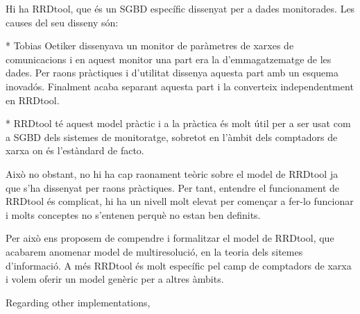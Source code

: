 Hi ha RRDtool, que és un SGBD específic dissenyat per a dades monitorades. Les causes del seu disseny són:

* Tobias Oetiker dissenyava un monitor de paràmetres de xarxes de comunicacions i en aquest monitor una part era la d'emmagatzematge de les dades. Per raons pràctiques i d'utilitat dissenya aquesta part amb un esquema inovadós. Finalment acaba separant aquesta part i la converteix independentment en RRDtool.

* RRDtool té aquest model pràctic i a la pràctica és molt útil per a ser usat com a SGBD dels sistemes de monitoratge, sobretot en l'àmbit dels comptadors de xarxa on és l'estàndard de facto. 

Això no obstant, no hi ha cap raonament teòric sobre el model de RRDtool ja que s'ha dissenyat per raons pràctiques. Per tant, entendre el funcionament de RRDtool és complicat, hi ha un nivell molt elevat per començar a fer-lo funcionar i molts conceptes no s'entenen perquè no estan ben definits. 

Per això ens proposem de compendre i formalitzar el model de RRDtool, que acabarem anomenar model de multiresolució, en la teoria dels sitemes d'informació. A més RRDtool és molt específic pel camp de comptadors de xarxa i volem oferir un model genèric per a altres àmbits.  






Regarding other implementations,




